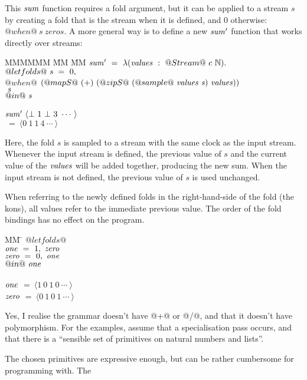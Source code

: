 This $\mathit{sum}$ function requires a fold argument, but it can be applied to a stream $s$ by creating a fold that is the stream when it is defined, and $0$ otherwise: $@when@~s~zeros$.
A more general way is to define a new $\mathit{sum'}$ function that works directly over streams:
\begin{tabbing}
MMMMMM \= MM \= MM \kill
$\mathit{sum'}~=~\lambda{}(\mathit{values}~:~@Stream@~c~\mathbb{N}).$ \\
$@let folds@~\mathit{s}~=~0,$ \\
\> $@when@$ \> $(@mapS@~(+)~(@zipS@~(@sample@~\mathit{values}~\mathit{s})~\mathit{values}))$ \\
\> \> $~\mathit{s}$ \\
$@in@~\mathit{s}$
\\
\\
$\mathit{sum'}~\langle \bot~1~\bot~3~\cdots~\rangle$ \\
$~=~\langle 0~1~1~4~\cdots~\rangle$ \\
\end{tabbing}

Here, the fold $s$ is sampled to a stream with the same clock as the input stream.
Whenever the input stream is defined, the previous value of $s$ and the current value of the $\mathit{values}$ will be added together, producing the new sum.
When the input stream is not defined, the previous value of $s$ is used unchanged.

When referring to the newly defined folds in the right-hand-side of the fold (the kons), all values refer to the immediate previous value.
The order of the fold bindings has no effect on the program.
\begin{tabbing}
MM \= \kill
$@let folds@$ \\
\> $\mathit{one}~=~1,~\mathit{zero}$ \\
\> $\mathit{zero}~=~0,~\mathit{one}$ \\
$@in@~\mathit{one}$
\\
\\
$\mathit{one}$  \> $=~\langle 1~0~1~0~\cdots~\rangle$ \\
$\mathit{zero}$ \> $=~\langle 0~1~0~1~\cdots~\rangle$ \\
\end{tabbing}


Yes, I realise the grammar doesn't have @+@ or @/@, and that it doesn't have polymorphism.
For the examples, assume that a specialisation pass occurs, and that there is a ``sensible set of primitives on natural numbers and lists''.

The chosen primitives are expressive enough, but can be rather cumbersome for programming with.
The 



